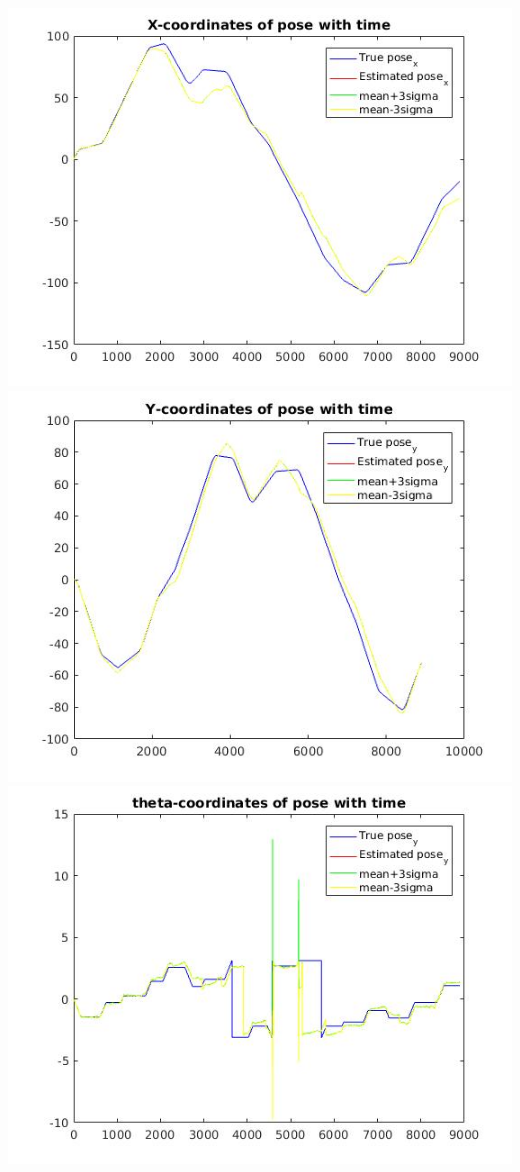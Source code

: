 \documentclass[a4paper,fleqn,11pt]{article}
\theoremstyle{mytheor}
\begin{document}
\begin{center}
\includegraphics[scale = 0.37]{../images/UKF-default1-xvt.jpg}
\includegraphics[scale = 0.37]{../images/UKF-default1-yvt.jpg}
\includegraphics[scale = 0.37]{../images/UKF-default1-avt.jpg}

\end{center}
\end{document}
